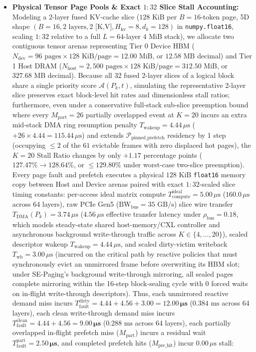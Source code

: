 \documentclass[conference,10pt]{IEEEtran}
\begin{document}
\begin{itemize}
    \item \textbf{Physical Tensor Page Pools \& Exact $1:32$ Slice Stall Accounting:} Modeling a 2-layer fused KV-cache slice ($128\text{ KiB}$ per $B=16$-token page, 5D shape $(B=16, 2\text{ layers}, 2\text{ [K,V]}, H_{\text{kv}}=8, d_k=128)$ in \texttt{numpy.float16}, scaling $1:32$ relative to a full $L=64$-layer $4\text{ MiB}$ stack), we allocate two contiguous tensor arenas representing Tier 0 Device HBM ($N_{\text{dev}} = 96\text{ pages} \times 128\text{ KiB/page} = 12.00\text{ MiB}$, or $12.58\text{ MB}$ decimal) and Tier 1 Host DRAM ($N_{\text{host}} = 2{,}500\text{ pages} \times 128\text{ KiB/page} = 312.50\text{ MiB}$, or $327.68\text{ MB}$ decimal). Because all 32 fused 2-layer slices of a logical block share a single priority score $\mathcal{A}(P_k, t)$, simulating the representative 2-layer slice preserves exact block-level hit rates and dimensionless stall ratios; furthermore, even under a conservative full-stack sub-slice preemption bound where every $M_{\text{part}} = 26$ partially overlapped event at $K=20$ incurs an extra mid-stack DMA ring resumption penalty $T_{\text{wakeup}} = 4.44\,\mu\text{s}$ ($+26 \times 4.44 = 115.44\,\mu\text{s}$) and extends $\mathcal{P}_{\text{pinned\_prefetch}}$ residency by 1 step (occupying $\le 2$ of the $61$ evictable frames with zero displaced hot pages), the $K=20$ Stall Ratio changes by only $+1.17$ percentage points ($127.47\% \to 128.64\%$, or $\le 129.80\%$ under worst-case two-slice preemption). Every page fault and prefetch executes a physical $128\text{ KiB}$ \texttt{float16} memory copy between Host and Device arenas paired with exact $1:32$-scaled slice timing constants: per-access ideal matrix compute $T_{\text{compute}}^{\text{ideal}} = 5.00\,\mu\text{s}$ ($160.0\,\mu\text{s}$ across 64 layers), raw PCIe Gen5 ($\text{BW}_{\text{bus}} = 35\text{ GB/s}$) slice wire transfer $T_{\text{DMA}}(P_k) = 3.74\,\mu\text{s}$ ($4.56\,\mu\text{s}$ effective transfer latency under $\rho_{\text{bus}} = 0.18$, which models steady-state shared host-memory/CXL controller and asynchronous background write-through traffic across $K \in \{4, \dots, 20\}$), scaled descriptor wakeup $T_{\text{wakeup}} = 4.44\,\mu\text{s}$, and scaled dirty-victim writeback $T_{\text{wb}} = 3.00\,\mu\text{s}$ (incurred on the critical path by reactive policies that must synchronously evict an unmirrored frame before overwriting its HBM slot; under SE-Paging's background write-through mirroring, all sealed pages complete mirroring within the 16-step block-sealing cycle with $0$ forced waits on in-flight write-through descriptors). Thus, each unmirrored reactive demand miss incurs $T_{\text{fault}}^{\text{dirty}} = 4.44 + 4.56 + 3.00 = \mathbf{12.00\,\mu\text{s}}$ ($0.384\text{ ms}$ across 64 layers), each clean write-through demand miss incurs $T_{\text{fault}}^{\text{clean}} = 4.44 + 4.56 = \mathbf{9.00\,\mu\text{s}}$ ($0.288\text{ ms}$ across 64 layers), each partially overlapped in-flight prefetch miss ($M_{\text{part}}$) incurs a residual wait $T_{\text{fault}}^{\text{part}} = \mathbf{2.50\,\mu\text{s}}$, and completed prefetch hits ($M_{\text{pre\_hit}}$) incur $0.00\,\mu\text{s}$ stall:

\end{itemize}
\end{document}
